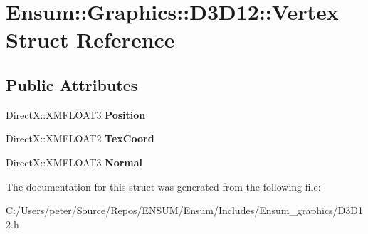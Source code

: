 \hypertarget{struct_ensum_1_1_graphics_1_1_d3_d12_1_1_vertex}{}\section{Ensum\+:\+:Graphics\+:\+:D3\+D12\+:\+:Vertex Struct Reference}
\label{struct_ensum_1_1_graphics_1_1_d3_d12_1_1_vertex}
\subsection*{Public Attributes}
\begin{DoxyCompactItemize}
\item 
Direct\+X\+::\+X\+M\+F\+L\+O\+A\+T3 {\bfseries Position}\hypertarget{struct_ensum_1_1_graphics_1_1_d3_d12_1_1_vertex_ad69d2f2d012446f8a31ec4d154b3788f}{}\label{struct_ensum_1_1_graphics_1_1_d3_d12_1_1_vertex_ad69d2f2d012446f8a31ec4d154b3788f}

\item 
Direct\+X\+::\+X\+M\+F\+L\+O\+A\+T2 {\bfseries Tex\+Coord}\hypertarget{struct_ensum_1_1_graphics_1_1_d3_d12_1_1_vertex_a63c5b8d9faf97f9c557b96c661530fa1}{}\label{struct_ensum_1_1_graphics_1_1_d3_d12_1_1_vertex_a63c5b8d9faf97f9c557b96c661530fa1}

\item 
Direct\+X\+::\+X\+M\+F\+L\+O\+A\+T3 {\bfseries Normal}\hypertarget{struct_ensum_1_1_graphics_1_1_d3_d12_1_1_vertex_a2fdd1c508dd691816c551acff525e508}{}\label{struct_ensum_1_1_graphics_1_1_d3_d12_1_1_vertex_a2fdd1c508dd691816c551acff525e508}

\end{DoxyCompactItemize}


The documentation for this struct was generated from the following file\+:\begin{DoxyCompactItemize}
\item 
C\+:/\+Users/peter/\+Source/\+Repos/\+E\+N\+S\+U\+M/\+Ensum/\+Includes/\+Ensum\+\_\+graphics/D3\+D12.\+h\end{DoxyCompactItemize}
